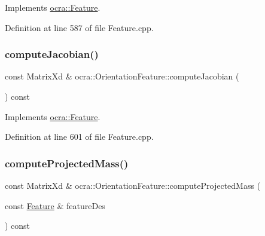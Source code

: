 Implements \hyperlink{classocra_1_1Feature_a4fb8eeeed978a1f727ec43cd1bd18d78}{ocra\+::\+Feature}.



Definition at line 587 of file Feature.\+cpp.

\hypertarget{classocra_1_1OrientationFeature_abcbc478b32843cc055c3b7002ce91e7c}{}\label{classocra_1_1OrientationFeature_abcbc478b32843cc055c3b7002ce91e7c} 
\subsubsection{\texorpdfstring{compute\+Jacobian()}{computeJacobian()}\hspace{0.1cm}{\footnotesize\ttfamily [2/2]}}
{\footnotesize\ttfamily const Matrix\+Xd \& ocra\+::\+Orientation\+Feature\+::compute\+Jacobian (\begin{DoxyParamCaption}{ }\end{DoxyParamCaption}) const\hspace{0.3cm}{\ttfamily [virtual]}}



Implements \hyperlink{classocra_1_1Feature_adbab3b388657555abb805bb971c2491f}{ocra\+::\+Feature}.



Definition at line 601 of file Feature.\+cpp.

\hypertarget{classocra_1_1OrientationFeature_ae30a255a7e0edf9704c0c8e2dbd5447f}{}\label{classocra_1_1OrientationFeature_ae30a255a7e0edf9704c0c8e2dbd5447f} 
\subsubsection{\texorpdfstring{compute\+Projected\+Mass()}{computeProjectedMass()}\hspace{0.1cm}{\footnotesize\ttfamily [1/2]}}
{\footnotesize\ttfamily const Matrix\+Xd \& ocra\+::\+Orientation\+Feature\+::compute\+Projected\+Mass (\begin{DoxyParamCaption}\item[{const \hyperlink{classocra_1_1Feature}{Feature} \&}]{feature\+Des }\end{DoxyParamCaption}) const\hspace{0.3cm}{\ttfamily [virtual]}}



